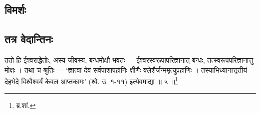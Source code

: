 \subsection{विमर्शः}

\subsection{तत्र वेदान्तिनः} ततो हि ईश्वराद्धेतोः, अस्य जीवस्य, बन्धमोक्षौ भवतः — ईश्वरस्वरूपापरिज्ञानात् बन्धः, तत्स्वरूपपरिज्ञानात्तु मोक्षः । तथा च श्रुतिः — ‘ज्ञात्वा देवं सर्वपाशापहानिः क्षीणैः क्लेशैर्जन्ममृत्युप्रहाणिः । तस्याभिध्यानात्तृतीयं देहभेदे विश्वैश्वर्यं केवल आप्तकामः’ (श्वे. उ. १-११) इत्येवमाद्या ॥ ५ ॥\footnote{ब्र.शां.}
